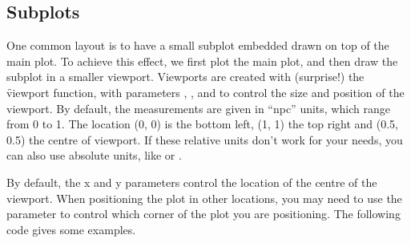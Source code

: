 % 


\subsection{Subplots}

One common layout is to have a small subplot embedded drawn on top of the main plot.  To achieve this effect, we first plot the main plot, and then draw the subplot in a smaller viewport.  Viewports are created with (surprise!) the \f{viewport} function, with parameters , ,  and  to control the size and position of the viewport. By default, the measurements are given in ``npc'' units, which range from 0 to 1. The location (0, 0) is the bottom left, (1, 1) the top right and (0.5, 0.5) the centre of viewport.  If these relative units don't work for your needs, you can also use absolute units, like  or .  

% 
% 
% 


By default, the x and y parameters control the location of the centre of the viewport. When positioning the plot in other locations, you may need to use the  parameter to control which corner of the plot you are positioning.  The following code gives some examples.

% 


